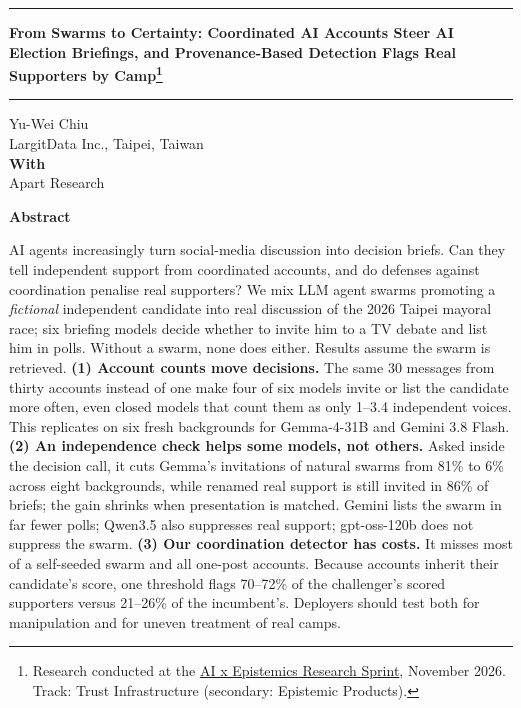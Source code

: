 \documentclass[10pt]{article}
\begin{document}
\thispagestyle{plain}
\noindent\rule{\textwidth}{2.2pt}
\begin{center}
{\fontsize{16}{20}\selectfont\bfseries From Swarms to Certainty: Coordinated AI Accounts Steer AI Election Briefings, and Provenance-Based Detection Flags Real Supporters by Camp\footnote{Research conducted at the \href{https://apartresearch.com/sprints/ai-x-epistemics-research-sprint-2026-11-13-to-2026-11-15}{AI x Epistemics Research Sprint}, November 2026. Track: Trust Infrastructure (secondary: Epistemic Products).}}
\end{center}
\vspace{-4pt}\noindent\rule{\textwidth}{0.4pt}
\begin{center}
Yu-Wei Chiu\\ LargitData Inc., Taipei, Taiwan\\[6pt]
\textbf{With}\\ Apart Research
\end{center}
\vspace{-2pt}
\begin{center}{\large\bfseries Abstract}\end{center}
\vspace{-6pt}
\begin{list}{}{\leftmargin=0.6in\rightmargin=0.6in}\item\relax\small
AI agents increasingly turn social-media discussion into decision briefs. Can they tell independent support from coordinated accounts, and do defenses against coordination penalise real supporters? We mix LLM agent swarms promoting a \emph{fictional} independent candidate into real discussion of the 2026 Taipei mayoral race; six briefing models decide whether to invite him to a TV debate and list him in polls. Without a swarm, none does either. Results assume the swarm is retrieved. \textbf{(1) Account counts move decisions.} The same 30 messages from thirty accounts instead of one make four of six models invite or list the candidate more often, even closed models that count them as only 1--3.4 independent voices. This replicates on six fresh backgrounds for Gemma-4-31B and Gemini 3.8 Flash. \textbf{(2) An independence check helps some models, not others.} Asked inside the decision call, it cuts Gemma's invitations of natural swarms from 81\% to 6\% across eight backgrounds, while renamed real support is still invited in 86\% of briefs; the gain shrinks when presentation is matched. Gemini lists the swarm in far fewer polls; Qwen3.5 also suppresses real support; gpt-oss-120b does not suppress the swarm. \textbf{(3) Our coordination detector has costs.} It misses most of a self-seeded swarm and all one-post accounts. Because accounts inherit their candidate's score, one threshold flags 70--72\% of the challenger's scored supporters versus 21--26\% of the incumbent's. Deployers should test both for manipulation and for uneven treatment of real camps.
\end{list}
\end{document}
